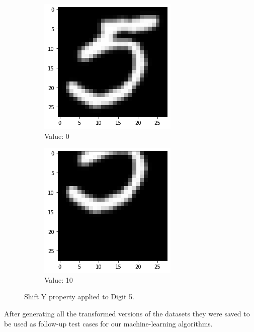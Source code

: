 \begin{figure}[htb!]
\begin{subfigure}[b]{.3\textwidth}
            \includegraphics[width=\textwidth]{images/shifty2.png}
            \caption{Value: 0}
            \label{fig:Rotate-misclass0}
        \end{subfigure}%
        \begin{subfigure}[b]{.3\textwidth}
            \centering
            \includegraphics[width=\linewidth]{images/shifty3.png}
            \caption{Value: 10}
            \label{fig:Rotate-misclass0}
        \end{subfigure}
        
        \caption{Shift Y property applied to Digit 5.}
        \label{fig:Rotate-misclassifications}
    \end{figure}
    \FloatBarrier

After generating all the transformed versions of the datasets they were saved to be used as follow-up test cases for our machine-learning algorithms.